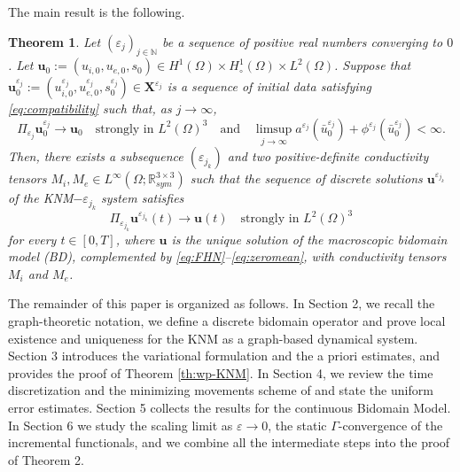 \documentclass[a4paper,11pt]{article}
\newtheorem{theorem}{Theorem}[section]
\theoremstyle{definition}
\numberwithin{equation}{section}
\newcommand{\e}{\varepsilon}
\newcommand{\R}{\mathbb{R}}
\begin{document}
The main result is the following.
\begin{theorem}
	\label{th:main}
	Let $(\e_j)_{j\in \mathbb{N}}$ be a sequence of positive real numbers converging to $0$. Let $\mathbf{u}_0 := (u_{i,0}, u_{e,0}, s_0) \in H^1(\Omega) \times H_\circ^1(\Omega) \times L^2(\Omega)$. Suppose that $\mathbf{u}_0^{\varepsilon_j} := (u_{i,0}^{\varepsilon_j}, u_{e,0}^{\varepsilon_j}, s_0^{\varepsilon_j}) \in \mathbf{X}^{\varepsilon_j}$ is a sequence of initial data satisfying \eqref{eq:compatibility} such that, as $j \to \infty$, 
	\[
	\Pi_{\varepsilon_j}\mathbf{u}_0^{\varepsilon_j} \to \mathbf{u}_0\quad \text{strongly in } L^2(\Omega)^3\quad \text{and}\quad
	\limsup_{j\to \infty} a^{\varepsilon_j}(\bar u_0^{\varepsilon_j}) +\phi^{\varepsilon_j}(\bar u_0^{\varepsilon_j}) < \infty. 
	\]
	Then, there exists a subsequence $(\e_{j_k})$ and two positive-definite conductivity tensors $M_i, M_e \in L^\infty(\Omega;  \R^{3 \times 3}_{sym})$ such that the sequence of discrete solutions $\mathbf{u}^{\varepsilon_{j_k}}$ of the KNM$-\varepsilon_{j_k}$ system satisfies 
	\[
	\Pi_{\varepsilon_{j_k}}\mathbf{u}^{\varepsilon_{j_k}}(t) \to \mathbf{u}(t)\quad \text{strongly in } L^2(\Omega)^3
	\] 
	for every $t \in [0,T]$, where $\mathbf{u}$ is the unique solution of the macroscopic bidomain model (BD), complemented by \eqref{eq:FHN}--\eqref{eq:zeromean}, with conductivity tensors $M_i$ and $M_e$.
\end{theorem}
The remainder of this paper is organized as follows. In Section 2, we recall the graph-theoretic notation, we define a discrete bidomain operator and prove local existence and uniqueness for the KNM as a graph-based dynamical system. Section 3 introduces the variational formulation and the a priori estimates, and provides the proof of Theorem \ref{th:wp-KNM}. In Section 4, we review the time discretization and the minimizing movements scheme of \cite{PSCF05} and state the uniform error estimates. Section 5 collects the results for the continuous Bidomain Model. In Section 6 we study the scaling limit as $\e \to 0$, the static $\Gamma$-convergence of the incremental functionals, and we combine all the intermediate steps into the proof of Theorem 2.
\end{document}
